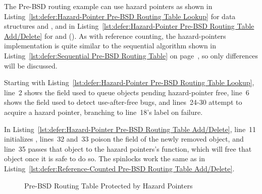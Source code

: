 The Pre-BSD routing example can use hazard pointers as shown in
Listing~\ref{lst:defer:Hazard-Pointer Pre-BSD Routing Table Lookup}
for data structures and , and in
Listing~\ref{lst:defer:Hazard-Pointer Pre-BSD Routing Table Add/Delete}
for  and 
().
As with reference counting, the hazard-pointers implementation
is quite similar to the sequential algorithm shown in
Listing~\ref{lst:defer:Sequential Pre-BSD Routing Table}
on
page~\pageref{lst:defer:Sequential Pre-BSD Routing Table},
so only differences will be discussed.

Starting with
Listing~\ref{lst:defer:Hazard-Pointer Pre-BSD Routing Table Lookup},
line~2 shows the  field used to queue objects pending
hazard-pointer free,
line~6 shows the  field used to detect use-after-free bugs,
and lines~24-30 attempt to acquire a hazard pointer, branching
to line~18's  label on failure.

In
Listing~\ref{lst:defer:Hazard-Pointer Pre-BSD Routing Table Add/Delete},
line~11 initializes ,
lines~32 and~33 poison the  field of the newly removed
object, and
line~35 passes that object to the hazard pointers's
 function, which will free that object once it
is safe to do so.
The spinlocks work the same as in
Listing~\ref{lst:defer:Reference-Counted Pre-BSD Routing Table Add/Delete}.

\begin{figure}[tb]
\centering
{}
\caption{Pre-BSD Routing Table Protected by Hazard Pointers}
\label{fig:defer:Pre-BSD Routing Table Protected by Hazard Pointers}
\end{figure}


